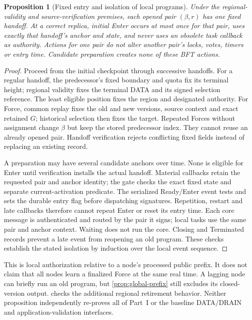 \documentclass[11pt,a4paper]{article}
\newtheorem{proposition}[proposition]{Proposition}
\begin{document}
\begin{proposition}[Fixed entry and isolation of local programs]
\label{prop:program-isolation}
Under the regional-validity and source-verification premises, each
opened pair $(\beta,r)$ has one fixed handoff. At a correct replica,
initial Enter occurs at most once for that pair, uses exactly that
handoff's anchor and state, and never uses an obsolete task callback
as authority. Actions for one pair do not alter another pair's locks,
votes, timers or entry time. Candidate preparation creates none of
these BFT actions.
\end{proposition}
\begin{proof}
Proceed from the initial checkpoint through successive handoffs.
For a regular handoff, the predecessor's fixed boundary and quota fix
its terminal height; regional validity fixes the terminal DATA and its
signed selection reference. The least eligible position fixes the
region and designated authority. For Force, common replay fixes the
old and new versions, source context and exact retained $G$; historical
selection then fixes the target. Repeated Forces without assignment
change $\beta$ but keep the stored predecessor index. They cannot
reuse an already opened pair. Handoff verification rejects conflicting
fixed fields instead of replacing an existing record.

A preparation may have several candidate anchors over time. None is
eligible for Enter until verification installs the actual handoff.
Material callbacks retain the requested pair and anchor identity;
the gate checks the exact fixed state and separate current-activation predicate.
The serialized Ready/Enter event tests and sets the durable entry flag
before dispatching signatures. Repetition, restart and late callbacks
therefore cannot repeat Enter or reset its entry time. Each core
message is authenticated and routed by the pair it signs; local tasks
use the same pair and anchor context. Waiting does not run the core.
Closing and Terminated records prevent a late event from reopening an
old program. These checks establish the stated isolation by induction
over the local event sequence.
\end{proof}

This is local authorization relative to a node's processed public
prefix. It does not claim that all nodes learn a finalized Force at the
same real time. A lagging node can briefly run an old program, but
\cref{prop:global-prefix} still excludes its closed-version output.
 checks the additional regional retirement
behavior. Neither proposition independently re-proves all of Part~I
or the baseline DATA/DRAIN and application-validation interfaces.
\end{document}
